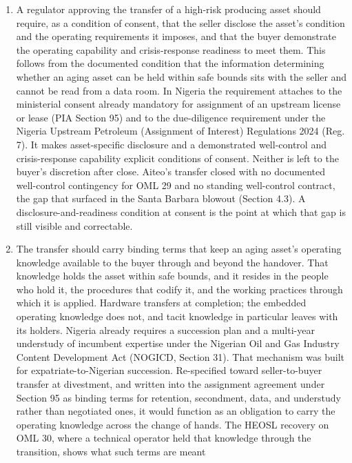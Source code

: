 \documentclass[twoside,fontset=lmodern]{mitthesis}
\begin{document}
\begin{enumerate}
\def\labelenumi{\arabic{enumi}.}
\item
  A regulator approving the transfer of a high-risk producing asset
  should require, as a condition of consent, that the seller disclose
  the asset's condition and the operating requirements it imposes, and
  that the buyer demonstrate the operating capability and
  crisis-response readiness to meet them. This follows from the
  documented condition that the information determining whether an aging
  asset can be held within safe bounds sits with the seller and cannot
  be read from a data room. In Nigeria the requirement attaches to the
  ministerial consent already mandatory for assignment of an upstream
  license or lease (PIA Section 95) and to the due-diligence requirement
  under the Nigeria Upstream Petroleum (Assignment of Interest)
  Regulations 2024 (Reg. 7). It makes asset-specific disclosure and a
  demonstrated well-control and crisis-response capability explicit
  conditions of consent. Neither is left to the buyer's discretion after
  close. Aiteo's transfer closed with no documented well-control
  contingency for OML 29 and no standing well-control contract, the gap
  that surfaced in the Santa Barbara blowout (Section 4.3). A
  disclosure-and-readiness condition at consent is the point at which
  that gap is still visible and correctable.
\item
  The transfer should carry binding terms that keep an aging asset's
  operating knowledge available to the buyer through and beyond the
  handover. That knowledge holds the asset within safe bounds, and it
  resides in the people who hold it, the procedures that codify it, and
  the working practices through which it is applied. Hardware transfers
  at completion; the embedded operating knowledge does not, and tacit
  knowledge in particular leaves with its holders. Nigeria already
  requires a succession plan and a multi-year understudy of incumbent
  expertise under the Nigerian Oil and Gas Industry Content Development
  Act (NOGICD, Section 31). That mechanism was built for
  expatriate-to-Nigerian succession. Re-specified toward seller-to-buyer
  transfer at divestment, and written into the assignment agreement
  under Section 95 as binding terms for retention, secondment, data, and
  understudy rather than negotiated ones, it would function as an
  obligation to carry the operating knowledge across the change of
  hands. The HEOSL recovery on OML 30, where a technical operator held
  that knowledge through the transition, shows what such terms are meant

\end{enumerate}
\end{document}
